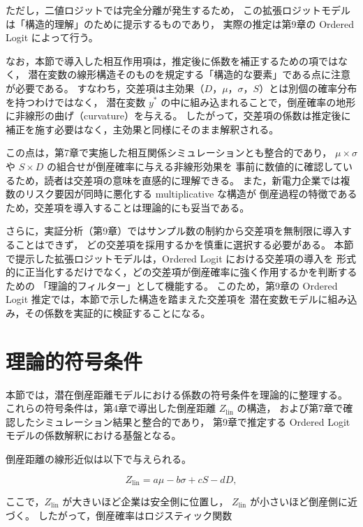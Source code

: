 ただし，二値ロジットでは完全分離が発生するため，
この拡張ロジットモデルは「構造的理解」のために提示するものであり，
実際の推定は第9章の Ordered Logit によって行う。

なお，本節で導入した相互作用項は，推定後に係数を補正するための項ではなく，
潜在変数の線形構造そのものを規定する「構造的な要素」である点に注意が必要である。
すなわち，交差項は主効果（$D$，$\mu$，$\sigma$，$S$）とは別個の確率分布を持つわけではなく，
潜在変数 $y^*$ の中に組み込まれることで，倒産確率の地形に非線形の曲げ（curvature）を与える。
したがって，交差項の係数は推定後に補正を施す必要はなく，主効果と同様にそのまま解釈される。

この点は，第7章で実施した相互関係シミュレーションとも整合的であり，
$\mu \times \sigma$ や $S \times D$ の組合せが倒産確率に与える非線形効果を
事前に数値的に確認しているため，読者は交差項の意味を直感的に理解できる。
また，新電力企業では複数のリスク要因が同時に悪化する multiplicative な構造が
倒産過程の特徴であるため，交差項を導入することは理論的にも妥当である。

さらに，実証分析（第9章）ではサンプル数の制約から交差項を無制限に導入することはできず，
どの交差項を採用するかを慎重に選択する必要がある。
本節で提示した拡張ロジットモデルは，Ordered Logit における交差項の導入を
形式的に正当化するだけでなく，どの交差項が倒産確率に強く作用するかを判断するための
「理論的フィルター」として機能する。
このため，第9章の Ordered Logit 推定では，本節で示した構造を踏まえた交差項を
潜在変数モデルに組み込み，その係数を実証的に検証することになる。



\section{理論的符号条件}

本節では，潜在倒産距離モデルにおける係数の符号条件を理論的に整理する。
これらの符号条件は，第4章で導出した倒産距離 $Z_{\text{lin}}$ の構造，
および第7章で確認したシミュレーション結果と整合的であり，
第9章で推定する Ordered Logit モデルの係数解釈における基盤となる。

倒産距離の線形近似は以下で与えられる。



\[
Z_{\text{lin}} = a\mu - b\sigma + cS - dD,
\]



ここで，$Z_{\text{lin}}$ が大きいほど企業は安全側に位置し，
$Z_{\text{lin}}$ が小さいほど倒産側に近づく。
したがって，倒産確率はロジスティック関数



